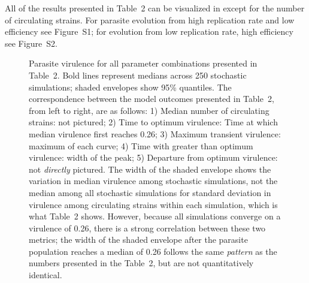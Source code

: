All of the results presented in Table~2 can be visualized in  except for the number of circulating strains. For parasite evolution from high replication rate and low efficiency see Figure~S1; for evolution from low replication rate, high efficiency see Figure~S2.

\clearpage
\begin{landscape}

\end{landscape}
\clearpage
\begin{figure}[H]
\caption{Parasite virulence for all parameter combinations presented in Table~2. Bold lines represent medians across 250 stochastic simulations; shaded envelopes show 95\% quantiles. The correspondence between the model outcomes presented in Table~2, from left to right, are as follows: 1) Median number of circulating strains: not pictured; 2) Time to optimum virulence: Time at which median virulence first reaches 0.26; 3) Maximum transient virulence: maximum of each curve; 4) Time with greater than optimum virulence: width of the peak; 5) Departure from optimum virulence: not \emph{directly} pictured. The width of the shaded envelope shows the variation in median virulence among stochastic simulations, not the median among all stochastic simulations for standard deviation in virulence among circulating strains within each simulation, which is what Table~2 shows. However, because all simulations converge on a virulence of 0.26, there is a strong correlation between these two metrics; the width of the shaded envelope after the parasite population reaches a median of 0.26 follows the same \emph{pattern} as the numbers presented in the Table~2, but are not quantitatively identical.} 
\label{fig:DTS1}
\end{figure} 
\clearpage


